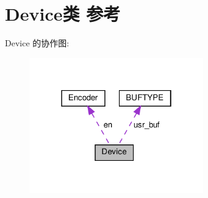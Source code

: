 \hypertarget{class_device}{}\section{Device类 参考}
\label{class_device}


Device 的协作图\+:
\nopagebreak
\begin{figure}[H]
\begin{center}
\leavevmode
\includegraphics[width=214pt]{class_device__coll__graph}
\end{center}
\end{figure}
